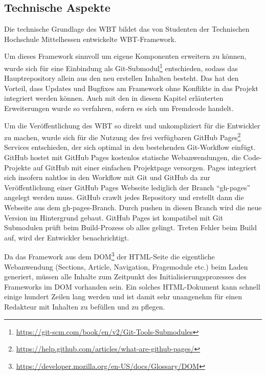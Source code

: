 \documentclass{article}
\begin{document}
\subsection{Technische Aspekte}
\label{ssec:tech}
Die technische Grundlage des WBT bildet das von Studenten der Technischen Hochschule Mittelhessen entwickelte WBT-Framework.

Um dieses Framework sinnvoll um eigene Komponenten erweitern zu k\"onnen, wurde sich f\"ur eine Einbindung als Git-Submodul\footnote{\url{https://git-scm.com/book/en/v2/Git-Tools-Submodules}} entschieden, sodass das Hauptrepository allein aus den neu erstellen Inhalten besteht. Das hat den Vorteil, dass Updates und Bugfixes am Framework ohne Konflikte in das Projekt integriert werden k\"onnen. Auch mit den in diesem Kapitel erl\"auterten Erweiterungen wurde so verfahren, sofern es sich um Fremdcode handelt.

Um die Ver\"offentlichung des WBT so direkt und unkompliziert f\"ur die Entwickler zu machen, wurde sich f\"ur die Nutzung des frei verf\"ugbaren GitHub Pages\footnote{\url{https://help.github.com/articles/what-are-github-pages/}} Services entschieden, der sich optimal in den bestehenden Git-Workflow einf\"ugt. GitHub hostet mit GitHub Pages kostenlos statische Webanwendungen, die Code-Projekte auf GitHub mit einer einfachen Projektpage versorgen. Pages integriert sich insofern nahtlos in den Workflow mit Git und GitHub da zur Ver\"offentlichung einer GitHub Pages Webseite lediglich der Branch “gh-pages” angelegt werden muss. GitHub crawlt jedes Repository und erstellt dann die Webseite aus dem gh-pages-Branch. Durch pushen in diesen Branch wird die neue Version im Hintergrund gebaut. GitHub Pages ist kompatibel mit Git Submodulen pr\"uft beim Build-Prozess ob alles gelingt. Treten Fehler beim Build auf, wird der Entwickler benachrichtigt.

Da das Framework aus dem DOM\footnote{\url{https://developer.mozilla.org/en-US/docs/Glossary/DOM}} der HTML-Seite die eigentliche Webanwendung (Sections, Article, Navigation, Fragemodule etc.) beim Laden generiert, m\"ussen alle Inhalte zum Zeitpunkt des Initialisierungsprozesses des Frameworks im DOM vorhanden sein. Ein solches HTML-Dokument kann schnell einige hundert Zeilen lang werden und ist damit sehr unangenehm f\"ur einen Redakteur mit Inhalten zu bef\"ullen und zu pflegen. 
\end{document}
